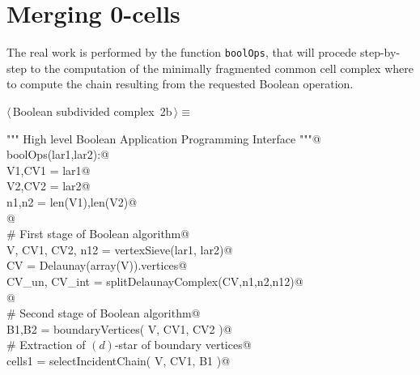 \documentclass[11pt,oneside]{article}	%
\begin{document}
\section{Merging 0-cells}

The real work is performed by the function \texttt{boolOps}, that will procede step-by-step to the computation of the minimally fragmented common cell complex where to compute the chain resulting from the requested Boolean operation.

\begin{flushleft} \small \label{scrap2}
\protect{}$\langle\,$Boolean subdivided complex\nobreak\ {\footnotesize 2b}$\,\rangle\equiv$
\vspace{-1ex}
\begin{list}{}{} \item
\mbox{}\verb@""" High level Boolean Application Programming Interface """@\\
\mbox{}\verb@def boolOps(lar1,lar2):@\\
\mbox{}\verb@   V1,CV1 = lar1@\\
\mbox{}\verb@   V2,CV2 = lar2@\\
\mbox{}\verb@   n1,n2 = len(V1),len(V2)@\\
\mbox{}\verb@   @\\
\mbox{}\verb@   # First stage of Boolean algorithm@\\
\mbox{}\verb@   V, CV1, CV2, n12 = vertexSieve(lar1, lar2)@\\
\mbox{}\verb@   CV = Delaunay(array(V)).vertices@\\
\mbox{}\verb@   CV_un, CV_int = splitDelaunayComplex(CV,n1,n2,n12)@\\
\mbox{}\verb@   @\\
\mbox{}\verb@   # Second stage of Boolean algorithm@\\
\mbox{}\verb@   B1,B2 = boundaryVertices( V, CV1, CV2 )@\\
\mbox{}\verb@   # Extraction of $(d)$-star of boundary vertices@\\
\mbox{}\verb@   cells1 = selectIncidentChain( V, CV1, B1 )@\\

\end{list}
\end{flushleft}
\end{document}
